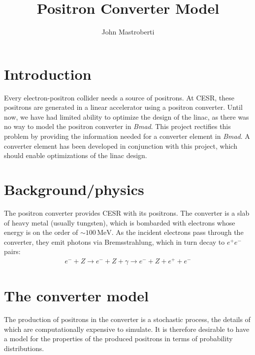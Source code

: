 \documentclass[12pt]{article}
\newcommand{\MeV}{\, \mathrm{MeV}}
\begin{document}
\title{Positron Converter Model}
\author{John Mastroberti}

\maketitle

\newcommand{\dxds}{\frac{dx}{ds}}
\newcommand{\dyds}{\frac{dy}{ds}}
\newcommand{\dxdsmin}{\dxds_{\mathrm{min}}}
\newcommand{\dxdsmax}{\dxds_{\mathrm{max}}}
\newcommand{\dydsmax}{\left| \dyds \right|_{\mathrm{max}}}
\newcommand{\exes}{\texttt{converter\_simulation}}
\newcommand{\exef}{\texttt{converter\_fitter}}
\newcommand{\configfile}{\texttt{config.txt}}
\newcommand{\bmad}{\textit{Bmad}}

\tableofcontents

\newpage

\section{Introduction}

Every electron-positron collider needs a source of positrons.
At CESR, these positrons are generated in a linear accelerator using a positron converter.
Until now, we have had limited ability to optimize the design of the linac, as there was no way to model the positron converter in \bmad.
This project rectifies this problem by providing the information needed for a converter element in \bmad.
A converter element has been developed in conjunction with this project, which should enable optimizations of the linac design.


\section{Background/physics}
The positron converter provides CESR with its positrons.
The converter is a slab of heavy metal (usually tungsten), which is bombarded with electrons whose energy is on the order of $\sim 100 \MeV$.
As the incident electrons pass through the converter, they emit photons via Bremsstrahlung, which in turn decay to $e^+ e^-$ pairs:
\begin{align}
e^- + Z \rightarrow e^- + Z + \gamma \rightarrow e^- + Z + e^+ + e^-
\end{align}


\section{The converter model}
The production of positrons in the converter is a stochastic process, the details of which are computationally expensive to simulate.
It is therefore desirable to have a model for the properties of the produced positrons in terms of probability distributions.
\end{document}
